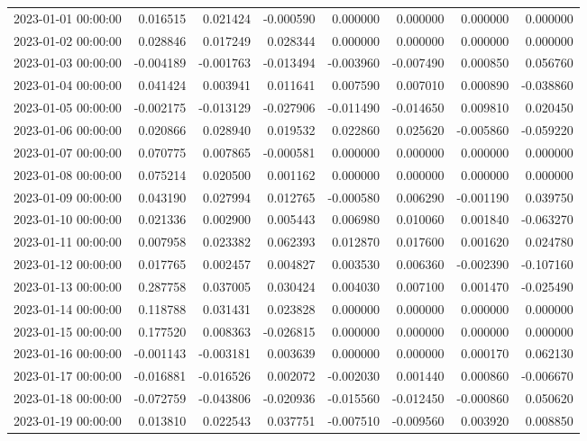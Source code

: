 \begin{tabular}{lrrrrrrr}
2023-01-01 00:00:00 & 0.016515 & 0.021424 & -0.000590 & 0.000000 & 0.000000 & 0.000000 & 0.000000 \\
2023-01-02 00:00:00 & 0.028846 & 0.017249 & 0.028344 & 0.000000 & 0.000000 & 0.000000 & 0.000000 \\
2023-01-03 00:00:00 & -0.004189 & -0.001763 & -0.013494 & -0.003960 & -0.007490 & 0.000850 & 0.056760 \\
2023-01-04 00:00:00 & 0.041424 & 0.003941 & 0.011641 & 0.007590 & 0.007010 & 0.000890 & -0.038860 \\
2023-01-05 00:00:00 & -0.002175 & -0.013129 & -0.027906 & -0.011490 & -0.014650 & 0.009810 & 0.020450 \\
2023-01-06 00:00:00 & 0.020866 & 0.028940 & 0.019532 & 0.022860 & 0.025620 & -0.005860 & -0.059220 \\
2023-01-07 00:00:00 & 0.070775 & 0.007865 & -0.000581 & 0.000000 & 0.000000 & 0.000000 & 0.000000 \\
2023-01-08 00:00:00 & 0.075214 & 0.020500 & 0.001162 & 0.000000 & 0.000000 & 0.000000 & 0.000000 \\
2023-01-09 00:00:00 & 0.043190 & 0.027994 & 0.012765 & -0.000580 & 0.006290 & -0.001190 & 0.039750 \\
2023-01-10 00:00:00 & 0.021336 & 0.002900 & 0.005443 & 0.006980 & 0.010060 & 0.001840 & -0.063270 \\
2023-01-11 00:00:00 & 0.007958 & 0.023382 & 0.062393 & 0.012870 & 0.017600 & 0.001620 & 0.024780 \\
2023-01-12 00:00:00 & 0.017765 & 0.002457 & 0.004827 & 0.003530 & 0.006360 & -0.002390 & -0.107160 \\
2023-01-13 00:00:00 & 0.287758 & 0.037005 & 0.030424 & 0.004030 & 0.007100 & 0.001470 & -0.025490 \\
2023-01-14 00:00:00 & 0.118788 & 0.031431 & 0.023828 & 0.000000 & 0.000000 & 0.000000 & 0.000000 \\
2023-01-15 00:00:00 & 0.177520 & 0.008363 & -0.026815 & 0.000000 & 0.000000 & 0.000000 & 0.000000 \\
2023-01-16 00:00:00 & -0.001143 & -0.003181 & 0.003639 & 0.000000 & 0.000000 & 0.000170 & 0.062130 \\
2023-01-17 00:00:00 & -0.016881 & -0.016526 & 0.002072 & -0.002030 & 0.001440 & 0.000860 & -0.006670 \\
2023-01-18 00:00:00 & -0.072759 & -0.043806 & -0.020936 & -0.015560 & -0.012450 & -0.000860 & 0.050620 \\
2023-01-19 00:00:00 & 0.013810 & 0.022543 & 0.037751 & -0.007510 & -0.009560 & 0.003920 & 0.008850 \\

\end{tabular}
